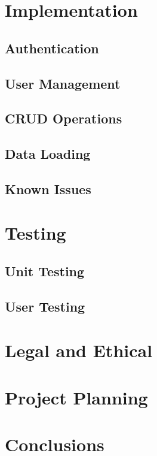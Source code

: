 \documentclass[12pt, a4paper,twoside]{report}
\theoremstyle{plain} %
\theoremstyle{definition} %
\numberwithin{equation}{chapter}
\begin{document}

\chapter{Implementation}\label{ch:implementation}

\section{Authentication}\label{sec:authentication}

\section{User Management}\label{sec:usermanagement}

\section{CRUD Operations}\label{sec:crudoperations}

\section{Data Loading}\label{sec:dataloading}

\section{Known Issues}\label{sec:knownissues}


\chapter{Testing}\label{ch:testing}

\section{Unit Testing}\label{sec:unittesting}

\section{User Testing}\label{sec:usertesting}


\chapter{Legal and Ethical}\label{ch:legalandethical}


\chapter{Project Planning}\label{ch:projectplanning}


\chapter{Conclusions}\label{ch:conclusion}



\end{document}
